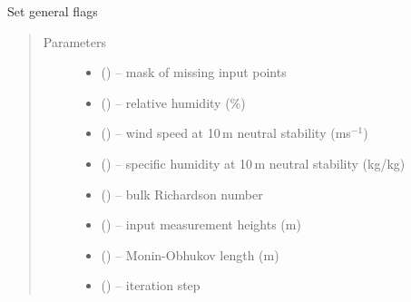 \documentclass[letterpaper,10pt,english]{sphinxmanual}
\begin{document}

\begin{fulllineitems}
\label{\detokenize{index:util_subs.set_flag}}
Set general flags
\begin{quote}\begin{description}
\item[{Parameters}] \leavevmode\begin{itemize}
\item{}
 (\href{https://docs.python.org/3/library/functions.html\#int}{}) -- mask of missing input points

\item{}
 (\href{https://docs.python.org/3/library/functions.html\#float}{}) -- relative humidity (\%)

\item{}
 (\href{https://docs.python.org/3/library/functions.html\#float}{}) -- wind speed at 10\,m neutral stability (ms$^{-1}$)

\item{}
 (\href{https://docs.python.org/3/library/functions.html\#float}{}) -- specific humidity at 10\,m neutral stability (kg/kg)

\item{}
 (\href{https://docs.python.org/3/library/functions.html\#float}{}) -- bulk Richardson number

\item{}
 (\href{https://docs.python.org/3/library/functions.html\#float}{}) -- input measurement heights (m)

\item{}
 (\href{https://docs.python.org/3/library/functions.html\#float}{}) -- Monin-Obhukov length (m)

\item{}
 (\href{https://docs.python.org/3/library/functions.html\#int}{}) -- iteration step


\end{itemize}
\end{description}
\end{quote}
\end{fulllineitems}
\end{document}
